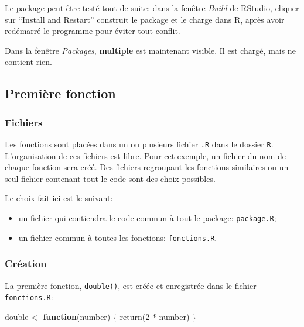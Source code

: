 \documentclass[
  11pt,
  french,
  a4paper,
  extrafontsizes,onecolumn,openright
  ]{memoir}
\newenvironment{Shaded}{\begin{snugshade}}{\end{snugshade}}
\newcommand{\ControlFlowTok}[1]{\textcolor[rgb]{0.13,0.29,0.53}{\textbf{#1}}}
\newcommand{\DecValTok}[1]{\textcolor[rgb]{0.00,0.00,0.81}{#1}}
\newcommand{\FunctionTok}[1]{\textcolor[rgb]{0.00,0.00,0.00}{#1}}
\newcommand{\NormalTok}[1]{#1}
\newcommand{\OtherTok}[1]{\textcolor[rgb]{0.56,0.35,0.01}{#1}}
\newcommand{\SpecialCharTok}[1]{\textcolor[rgb]{0.00,0.00,0.00}{#1}}
\providecommand{\tightlist}{%
  \setlength{\itemsep}{0pt}\setlength{\parskip}{0pt}}
\begin{document}
Le package peut être testé tout de suite: dans la fenêtre \emph{Build} de RStudio, cliquer sur ``Install and Restart'' construit le package et le charge dans R, après avoir redémarré le programme pour éviter tout conflit.

Dans la fenêtre \emph{Packages}, \textbf{multiple} est maintenant visible.
Il est chargé, mais ne contient rien.

\hypertarget{premiuxe8re-fonction}{%
\subsection{Première fonction}\label{premiuxe8re-fonction}}

\hypertarget{fichiers}{%
\subsubsection{Fichiers}\label{fichiers}}

Les fonctions sont placées dans un ou plusieurs fichier \texttt{.R} dans le dossier \texttt{R}.
L'organisation de ces fichiers est libre.
Pour cet exemple, un fichier du nom de chaque fonction sera créé.
Des fichiers regroupant les fonctions similaires ou un seul fichier contenant tout le code sont des choix possibles.

Le choix fait ici est le suivant:

\begin{itemize}
\tightlist
\item
  un fichier qui contiendra le code commun à tout le package: \texttt{package.R};
\item
  un fichier commun à toutes les fonctions: \texttt{fonctions.R}.
\end{itemize}

\hypertarget{cruxe9ation-1}{%
\subsubsection{Création}\label{cruxe9ation-1}}

La première fonction, \texttt{double()}, est créée et enregistrée dans le fichier \texttt{fonctions.R}:

\scriptsize

\begin{Shaded}
\begin{Highlighting}[]
\NormalTok{double }\OtherTok{\textless{}{-}} \ControlFlowTok{function}\NormalTok{(number) \{}
    \FunctionTok{return}\NormalTok{(}\DecValTok{2} \SpecialCharTok{*}\NormalTok{ number)}
\NormalTok{\}}
\end{Highlighting}
\end{Shaded}
\end{document}
